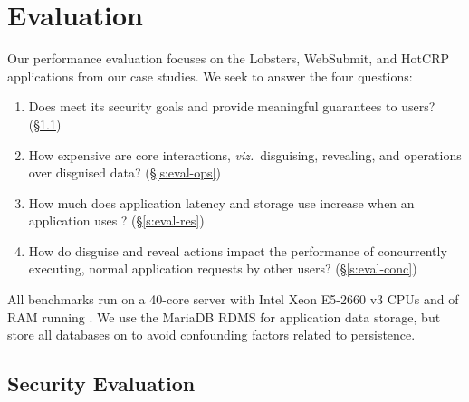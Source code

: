 \section{Evaluation}
\label{s:eval}

%
Our performance evaluation focuses on the Lobsters, WebSubmit, and HotCRP applications
from our case studies.
%
We seek to answer the four questions:
%
\begin{enumerate}[nosep]
 \item Does \sys meet its security goals and provide meaningful guarantees to users?
   (\S\ref{s:eval-security})
 \item How expensive are core \sys interactions, \emph{viz.}\ disguising, revealing, and
   operations over disguised data? (\S\ref{s:eval-ops})
 \item How much does application latency and storage use increase when an application
   uses \sys? (\S\ref{s:eval-res})
 \item How do disguise and reveal actions impact the performance of concurrently executing,
   normal application requests by other users? (\S\ref{s:eval-conc})
\end{enumerate}
%
All benchmarks run on a 40-core server with Intel Xeon E5-2660 v3 CPUs and  of RAM
running .
%
We use the MariaDB RDMS for application data storage, but store all databases on 
to avoid confounding factors related to persistence.
%

\subsection{Security Evaluation}
\label{s:eval-security}


